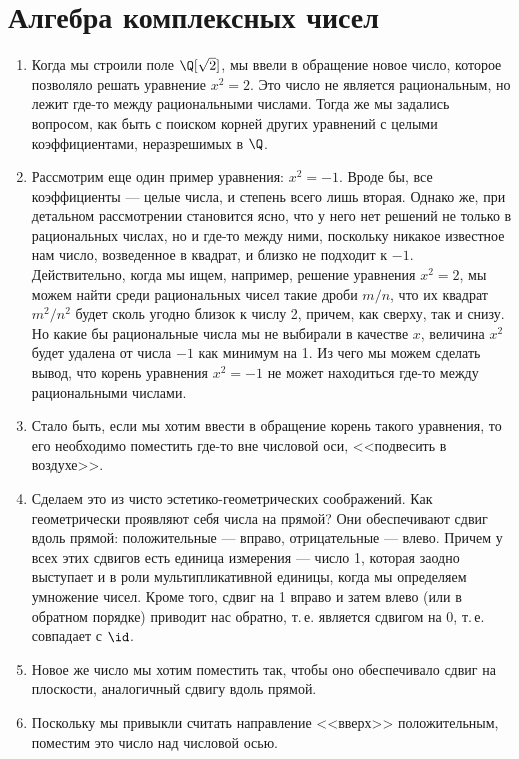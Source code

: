 \section{Алгебра комплексных чисел}


\begin{enumerate}
\item Когда мы строили поле $\Q[\sqrt 2]$, мы ввели в обращение новое число, которое позволяло решать уравнение $x^2=2$. Это число не является рациональным, но лежит где-то между рациональными числами. Тогда же мы задались вопросом, как быть с поиском корней других уравнений с целыми коэффициентами, неразрешимых в $\Q$.
\item Рассмотрим еще один пример уравнения: $x^2=-1$.
Вроде бы, все коэффициенты --- целые числа, и степень всего лишь вторая. Однако же, при детальном рассмотрении становится ясно, что у него нет решений не только в рациональных числах, но и где-то между ними, поскольку никакое известное нам число, возведенное в квадрат, и близко не подходит к $-1$. Действительно, когда мы ищем, например, решение уравнения $x^2=2$, мы можем найти среди рациональных чисел такие дроби $m/n$, что их квадрат $m^2/n^2$ будет сколь угодно близок к числу 2, причем, как сверху, так и снизу. Но какие бы рациональные числа мы не выбирали в качестве $x$, величина $x^2$ будет удалена от числа $-1$ как минимум на 1. Из чего мы можем сделать вывод, что корень уравнения $x^2=-1$ не может находиться где-то между рациональными числами.
\item Стало быть, если мы хотим ввести в обращение корень такого уравнения, то его необходимо поместить где-то вне числовой оси, <<подвесить в воздухе>>.
\item Сделаем это из чисто эстетико-геометрических соображений. Как геометрически проявляют себя числа на прямой? Они обеспечивают сдвиг вдоль прямой: положительные --- вправо, отрицательные --- влево. Причем у всех этих сдвигов есть единица измерения --- число 1, которая заодно выступает и в роли мультипликативной единицы, когда мы определяем умножение чисел. Кроме того, сдвиг на 1 вправо и затем влево (или в обратном порядке) приводит нас обратно, т.\,е. является сдвигом на 0, т.\,е. совпадает с $\id$.
\item Новое же число мы хотим поместить так, чтобы оно обеспечивало сдвиг на плоскости, аналогичный сдвигу вдоль прямой.
\item Поскольку мы привыкли считать направление <<вверх>> положительным, поместим это число над числовой осью.

\end{enumerate}
